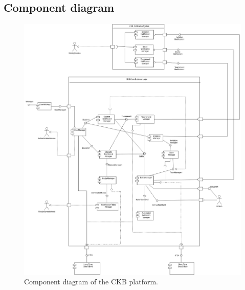\subsection{Component diagram}
\label{subsec:component_diagram}%
\begin{figure} [H]
    \begin{center}
        \includegraphics[width=1\linewidth]{Images/compdiag.png}
        \caption{Component diagram of the CKB platform.}
        \label{fig: cd}
    \end{center}
\end{figure}

